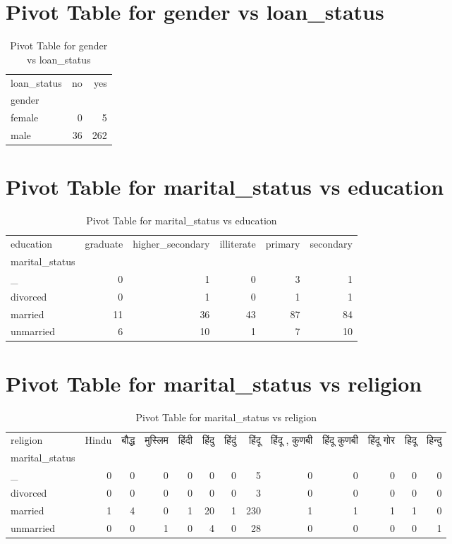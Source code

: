 \documentclass{article}
\begin{document}
\section{Pivot Table for gender vs loan_status}
\begin{table}
\caption{Pivot Table for gender vs loan_status}
\label{tab:gender_loan_status}
\begin{tabular}{lrr}
\toprule
loan_status & no & yes \\
gender &  &  \\
\midrule
female & 0 & 5 \\
male & 36 & 262 \\
\bottomrule
\end{tabular}
\end{table}

\section{Pivot Table for marital_status vs education}
\begin{table}
\caption{Pivot Table for marital_status vs education}
\label{tab:marital_status_education}
\begin{tabular}{lrrrrr}
\toprule
education & graduate & higher\_secondary & illiterate & primary & secondary \\
marital_status &  &  &  &  &  \\
\midrule
\_ & 0 & 1 & 0 & 3 & 1 \\
divorced & 0 & 1 & 0 & 1 & 1 \\
married & 11 & 36 & 43 & 87 & 84 \\
unmarried & 6 & 10 & 1 & 7 & 10 \\
\bottomrule
\end{tabular}
\end{table}

\section{Pivot Table for marital_status vs religion}
\begin{table}
\caption{Pivot Table for marital_status vs religion}
\label{tab:marital_status_religion}
\begin{tabular}{lrrrrrrrrrrrr}
\toprule
religion & Hindu & बौद्ध & मुस्लिम & हिंदी & हिंदु & हिंदुं & हिंदू & हिंदू , कुणबी & हिंदू कुणबी & हिंदू गोर & हिदू & हिन्दु \\
marital_status &  &  &  &  &  &  &  &  &  &  &  &  \\
\midrule
\_ & 0 & 0 & 0 & 0 & 0 & 0 & 5 & 0 & 0 & 0 & 0 & 0 \\
divorced & 0 & 0 & 0 & 0 & 0 & 0 & 3 & 0 & 0 & 0 & 0 & 0 \\
married & 1 & 4 & 0 & 1 & 20 & 1 & 230 & 1 & 1 & 1 & 1 & 0 \\
unmarried & 0 & 0 & 1 & 0 & 4 & 0 & 28 & 0 & 0 & 0 & 0 & 1 \\
\bottomrule
\end{tabular}
\end{table}
\end{document}
